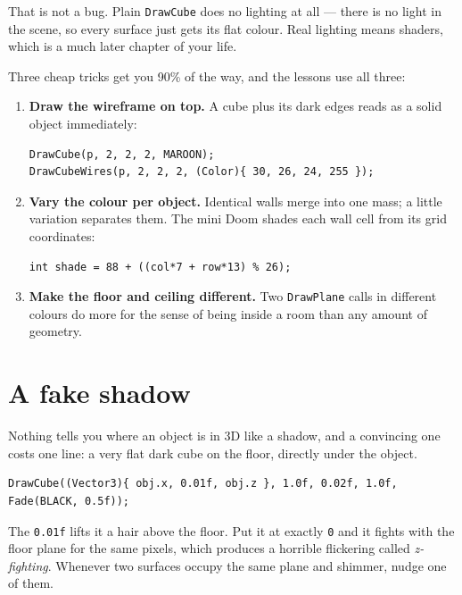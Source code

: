 That is not a bug. Plain \lstinline|DrawCube| does no lighting at all --- there
is no light in the scene, so every surface just gets its flat colour. Real
lighting means shaders, which is a much later chapter of your life.

Three cheap tricks get you 90\% of the way, and the lessons use all three:

\begin{enumerate}[leftmargin=*,itemsep=3pt]
  \item \textbf{Draw the wireframe on top.} A cube plus its dark edges reads as a
        solid object immediately:
\begin{lstlisting}
DrawCube(p, 2, 2, 2, MAROON);
DrawCubeWires(p, 2, 2, 2, (Color){ 30, 26, 24, 255 });
\end{lstlisting}

  \item \textbf{Vary the colour per object.} Identical walls merge into one mass;
        a little variation separates them. The mini Doom shades each wall cell
        from its grid coordinates:
\begin{lstlisting}
int shade = 88 + ((col*7 + row*13) % 26);
\end{lstlisting}

  \item \textbf{Make the floor and ceiling different.} Two
        \lstinline|DrawPlane| calls in different colours do more for the sense of
        being inside a room than any amount of geometry.
\end{enumerate}

\section{A fake shadow}

Nothing tells you where an object is in 3D like a shadow, and a convincing one
costs one line: a very flat dark cube on the floor, directly under the object.

\begin{lstlisting}
DrawCube((Vector3){ obj.x, 0.01f, obj.z }, 1.0f, 0.02f, 1.0f, Fade(BLACK, 0.5f));
\end{lstlisting}

The \lstinline|0.01f| lifts it a hair above the floor. Put it at exactly
\lstinline|0| and it fights with the floor plane for the same pixels, which
produces a horrible flickering called \emph{z-fighting}. Whenever two surfaces
occupy the same plane and shimmer, nudge one of them.

